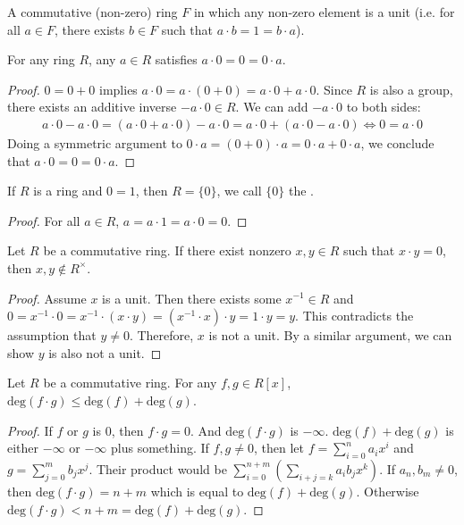 \documentclass[10pt]{article}
\begin{document}
\begin{hdefinition}[field]
    A commutative (non-zero) ring $F$ in which any non-zero element is a unit (i.e. for all $a\in F$, there exists $ b\in F$ such that $a\cdot b = 1 = b\cdot a$).
\end{hdefinition}
\begin{lemma}
    For any ring $R$, any $a\in R$ satisfies $a\cdot 0=0=0\cdot a$.
\end{lemma}
\begin{proof}
    $0=0+0$ implies $a\cdot 0 = a\cdot (0+0) = a\cdot 0+a\cdot 0$. Since $R$ is also a group, there exists an additive inverse $-a\cdot 0\in R$. We can add $-a\cdot 0$ to both sides:
    \begin{align*}
        a\cdot 0-a\cdot 0=(a\cdot 0+a\cdot 0)-a\cdot 0 = a\cdot 0+(a\cdot 0-a\cdot 0)  \iff {0 = a\cdot 0}
    \end{align*}
    Doing a symmetric argument to $0\cdot a = (0+0)\cdot a = 0\cdot a+0\cdot a$, we conclude that $a\cdot 0=0=0\cdot a$.
\end{proof}
\begin{corollary}
    If $R$ is a ring and $0=1$, then $R=\{0\}$, we call $\{0\}$ the .
\end{corollary}
\begin{proof}
    For all $a\in R$, $a = a\cdot 1 = a\cdot 0 = 0$.
\end{proof}
\begin{proposition}
    Let $R$ be a commutative ring. If there exist nonzero $x, y\in R$ such that $x\cdot y=0$, then $x, y\notin R^\times$.
\end{proposition}
\begin{proof}
    Assume $x$ is a unit. Then there exists some $x^{-1}\in R$ and $0 = x^{-1}\cdot 0 = x^{-1}\cdot (x\cdot y) = (x^{-1}\cdot x)\cdot y =1\cdot y = y$. This contradicts the assumption that $y\neq 0$. Therefore, $x$ is not a unit. By a similar argument, we can show $y$ is also not a unit.
\end{proof}
\begin{lemma}
    Let $R$ be a commutative ring. For any $f, g\in R[x]$, $\text{deg}(f\cdot g)\leq \text{deg}(f)+\text{deg}(g)$.
\end{lemma}
\begin{proof}
    {If $f$ or $g$ is $0$}, then $f\cdot g = 0$. And $\text{deg}(f\cdot g)$ is $-\infty$. $\text{deg}(f)+\text{deg}(g)$ is either $-\infty$ or $-\infty$ plus something. {If $f,g\neq 0$}, then let $f=\sum_{i=0}^{n}a_{i}x^{i}$ and $g=\sum_{j=0}^{m}b_{j}x^{j}$. Their product would be $\sum_{i=0}^{n+m}\left(\sum_{i+j=k} a_{i}b_{j}x^k \right)$. If $a_{n}, b_{m}\neq 0$, then $\text{deg}(f\cdot g)=n+m$ which is equal to $\text{deg}(f)+\text{deg}(g)$. Otherwise $\text{deg}(f\cdot g)< n+m = \text{deg}(f)+\text{deg}(g)$.
\end{proof}
\end{document}
